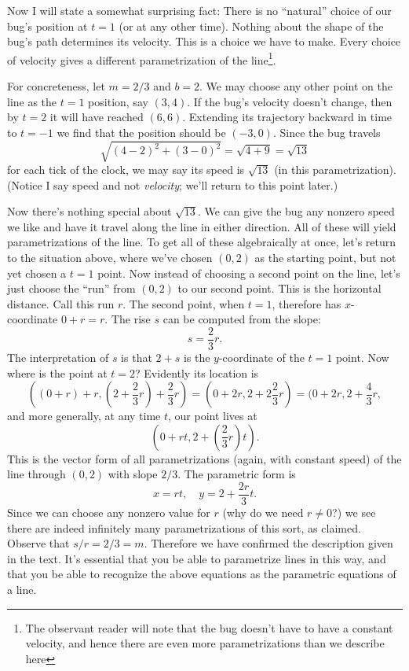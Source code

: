 \documentclass[11pt]{amsart}
\begin{document}
Now I will state a somewhat surprising fact: There is no ``natural'' choice of our bug's position at $t = 1$ (or at any other time). Nothing about the shape of the bug's path determines its velocity. This is a choice we have to make. Every choice of velocity gives a different parametrization of the line\footnote{The observant reader will note that the bug doesn't have to have a constant velocity, and hence there are even more parametrizations than we describe here}.

For concreteness, let $m = 2/3$ and $b = 2$. We may choose any other point on the line as the $t = 1$ position, say $(3,4)$. If the bug's velocity doesn't change, then by $t = 2$ it will have reached $(6,6)$. Extending its trajectory backward in time to $t = -1$ we find that the position should be $(-3,0)$. Since the bug travels
\[ 
 	\sqrt{(4-2)^2 + (3-0)^2} = \sqrt{4+9} = \sqrt{13}
\]
for each tick of the clock, we may say its speed is $\sqrt{13}$ (in this parametrization). (Notice I say speed and not \emph{velocity}; we'll return to this point later.)

Now there's nothing special about $\sqrt{13}$. We can give the bug any nonzero speed we like and have it travel along the line in either direction. All of these will yield parametrizations of the line. To get all of these algebraically at once, let's return to the situation above, where we've chosen $(0,2)$ as the starting point, but not yet chosen a $t = 1$ point. Now instead of choosing a second point on the line, let's just choose the ``run'' from $(0,2)$ to our second point. This is the horizontal distance. Call this run $r$. The second point, when $t = 1$, therefore has $x$-coordinate $0 + r = r$. The rise $s$ can be computed from the slope:
\[
	s = \frac{2}{3} r.
\]
The interpretation of $s$ is that $2 + s$ is the $y$-coordinate of the $t = 1$ point. Now where is the point at $t = 2$? Evidently its location is
\[
	((0+r)+r,(2+\frac{2}{3} r)+\frac{2}{3} r) = (0+2r,2+2\frac{2}{3} r) = (0+2r,2+\frac{4}{3} r,
\]
and more generally, at any time $t$, our point lives at
\[
	(0+rt,2+(\frac{2}{3}r)t).
\]
This is the vector form of all parametrizations (again, with constant speed) of the line through $(0,2)$ with slope $2/3$. The parametric form is
\[
	x = rt, \quad y = 2 + \frac{2r}{3}t.
\]
Since we can choose any nonzero value for $r$ (why do we need $r \ne 0$?) we see there are indeed infinitely many parametrizations of this sort, as claimed. Observe that $s/r = 2/3 = m$. Therefore we have confirmed the description given in the text. It's essential that you be able to parametrize lines in this way, and that you be able to recognize the above equations as the parametric equations of a line.
\end{document}
